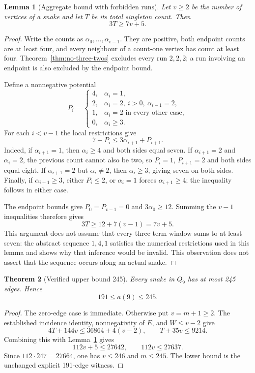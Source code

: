 \documentclass[11pt,a4paper]{article}
\newtheorem{theorem}{Theorem}[section]
\newtheorem{lemma}[theorem]{Lemma}
\theoremstyle{definition}
\theoremstyle{remark}
\newcommand{\Q}{Q}
\begin{document}
\begin{lemma}[Aggregate bound with forbidden runs]\label{lem:run-potential}
Let $v\ge2$ be the number of vertices of a snake and let $T$ be its total singleton count. Then
\[
3T\ge7v+5.
\]
\end{lemma}
\begin{proof}
Write the counts as $\alpha_0,\ldots,\alpha_{v-1}$. They are positive, both endpoint counts are at least four, and every neighbour of a count-one vertex has count at least four. Theorem~\ref{thm:no-three-twos} excludes every run $2,2,2$; a run involving an endpoint is also excluded by the endpoint bound.

Define a nonnegative potential
\[
P_i=\begin{cases}
4,&\alpha_i=1,\\
2,&\alpha_i=2,\ i>0,\ \alpha_{i-1}=2,\\
1,&\alpha_i=2\text{ in every other case},\\
0,&\alpha_i\ge3.
\end{cases}
\]
For each $i<v-1$ the local restrictions give
\[
7+P_i\le3\alpha_{i+1}+P_{i+1}.
\]
Indeed, if $\alpha_{i+1}=1$, then $\alpha_i\ge4$ and both sides equal seven. If $\alpha_{i+1}=2$ and $\alpha_i=2$, the previous count cannot also be two, so $P_i=1$, $P_{i+1}=2$ and both sides equal eight. If $\alpha_{i+1}=2$ but $\alpha_i\ne2$, then $\alpha_i\ge3$, giving seven on both sides. Finally, if $\alpha_{i+1}\ge3$, either $P_i\le2$, or $\alpha_i=1$ forces $\alpha_{i+1}\ge4$; the inequality follows in either case.

The endpoint bounds give $P_0=P_{v-1}=0$ and $3\alpha_0\ge12$. Summing the $v-1$ inequalities therefore gives
\[
3T\ge12+7(v-1)=7v+5.
\]
This argument does not assume that every three-term window sums to at least seven: the abstract sequence $1,4,1$ satisfies the numerical restrictions used in this lemma and shows why that inference would be invalid. This observation does not assert that the sequence occurs along an actual snake.
\end{proof}

\begin{theorem}[Verified upper bound 245]\label{thm:upper245}
Every snake in $\Q_9$ has at most 245 edges. Hence
\[
\boxed{191\le a(9)\le245.}
\]
\end{theorem}
\begin{proof}
The zero-edge case is immediate. Otherwise put $v=m+1\ge2$. The established incidence identity, nonnegativity of $E$, and $W\le v-2$ give
\[
4T+144v\le36864+4(v-2),\qquad T+35v\le9214.
\]
Combining this with Lemma~\ref{lem:run-potential} gives
\[
112v+5\le27642,\qquad112v\le27637.
\]
Since $112\cdot247=27664$, one has $v\le246$ and $m\le245$. The lower bound is the unchanged explicit 191-edge witness.
\end{proof}
\end{document}
